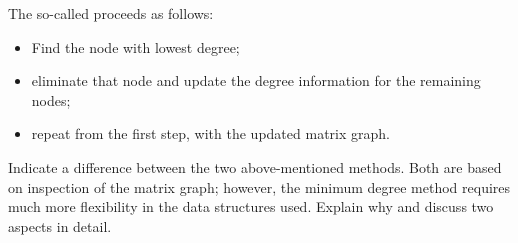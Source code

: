 The so-called  proceeds as follows:
\begin{itemize}
\item Find the node with lowest degree;
\item eliminate that node and update the degree information for the
  remaining nodes;
\item repeat from the first step, with the updated matrix graph.
\end{itemize}

\begin{exercise}
  Indicate a difference between the two above-mentioned methods. Both
  are based on inspection of the matrix graph; however, the minimum
  degree method requires much more flexibility in the data structures
  used. Explain why and discuss two aspects in detail.
\end{exercise}


